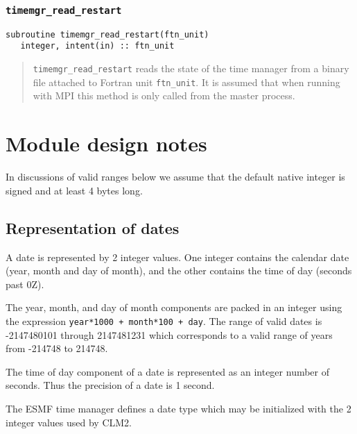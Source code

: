 \documentclass[12pt]{article}
\newlength{\parindentorig}
\newcommand{\code}[1]{\texttt{#1}}
\begin{document}
\subsubsection{\code{timemgr\_read\_restart}}
\begin{verbatim}
subroutine timemgr_read_restart(ftn_unit)
   integer, intent(in) :: ftn_unit
\end{verbatim}

\begin{quote}
\code{timemgr\_read\_restart} reads the state of the time manager from a
binary file attached to Fortran unit \code{ftn\_unit}.  It is assumed that
when running with MPI this method is only called from the master process.
\end{quote}

\setlength{\parindent}{\parindentorig}

\section{Module design notes}

In discussions of valid ranges below we assume that the default native
integer is signed and at least 4 bytes long.

\subsection{Representation of dates}

A date is represented by 2 integer values.  One integer contains the
calendar date (year, month and day of month), and the other contains the
time of day (seconds past 0Z).

The year, month, and day of month components are packed in an integer using
the expression \code{year*1000 + month*100 + day}.  The range of valid
dates is -2147480101 through 2147481231 which corresponds to a valid range
of years from -214748 to 214748.

The time of day component of a date is represented as an integer number of
seconds.  Thus the precision of a date is 1 second.

The ESMF time manager defines a date type which may be initialized with
the 2 integer values used by CLM2.
\end{document}
